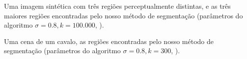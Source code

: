 \documentclass[12pt]{article}
\begin{document}
\begin{figure}[H]
    \centering
     \hfill
    
    
\end{figure}
 Uma imagem sintética com três regiões perceptualmente distintas, e as três maiores regiões encontradas pelo nosso método de segmentação (parâmetros do algoritmo $\sigma = 0.8, k = 100.000$, ).

 \begin{figure}[H]
    \centering
     \hfill
    
    
\end{figure}
 Uma cena de um cavalo, as regiões encontradas pelo nosso método de segmentação (parâmetros do algoritmo $\sigma = 0.8, k = 300$, ).
\end{document}

